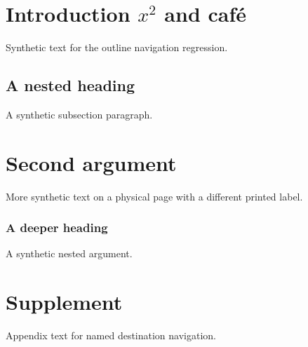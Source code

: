 \documentclass{article}
\begin{document}
\section{Introduction \texorpdfstring{$x^2$}{x\texttwosuperior} and caf\'e}
Synthetic text for the outline navigation regression.
\subsection{A nested heading}
A synthetic subsection paragraph.
\newpage
{}
\section{Second argument}
More synthetic text on a physical page with a different printed label.
\subsubsection{A deeper heading}
A synthetic nested argument.
\newpage
\appendix
\section{Supplement}
Appendix text for named destination navigation.
\end{document}
